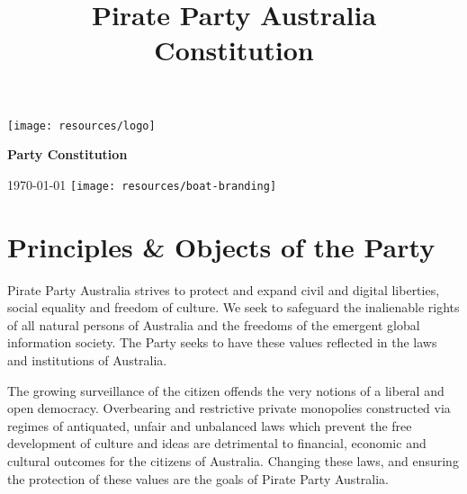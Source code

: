 \documentclass[a4paper,titlepage,8.5pt]{article}
\title{Pirate Party Australia Constitution}
\begin{document}

\begin{titlepage}
\begin{center}
\vspace*{0.5in}
\texttt{[image: resources/logo]}

\vspace{1in}
\huge{%
  \textbf{%
    Party Constitution
    }}

\vfill
\onehalfspacing

\large{
  \today
}
\vfill
\hspace*{-1.4in}\texttt{[image: resources/boat-branding]}
\end{center}
\restoregeometry
\end{titlepage}


\newpage
{}
\begingroup
\fontsize{9pt}{10.5pt}\selectfont
\tableofcontents
\endgroup
\thispagestyle{empty}
\restoregeometry
\newpage

\setcounter{page}{1}

\part{Principles \& Objects of the Party}
Pirate Party Australia strives to protect and expand civil and digital liberties, social equality and freedom of culture. We seek to safeguard the inalienable rights of all natural persons of Australia and the freedoms of the emergent global information society. The Party seeks to have these values reflected in the laws and institutions of Australia.

The growing surveillance of the citizen offends the very notions of a liberal and open democracy. Overbearing and restrictive private monopolies constructed via regimes of antiquated, unfair and unbalanced laws which prevent the free development of culture and ideas are detrimental to financial, economic and cultural outcomes for the citizens of Australia. Changing these laws, and ensuring the protection of these values are the goals of Pirate Party Australia.
\end{document}
